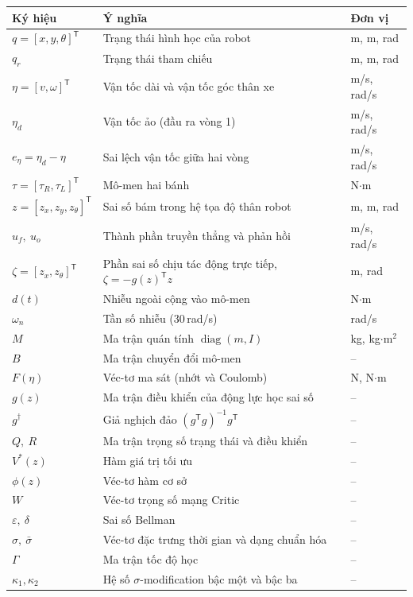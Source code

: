\documentclass[12pt,a4paper]{article}
\newcommand{\T}{\mathsf{T}}
\DeclareMathOperator{\diag}{diag}
\begin{document}
\begin{table}[H]
\centering
\small
\begin{tabular}{lll}
\toprule
\textbf{Ký hiệu} & \textbf{Ý nghĩa} & \textbf{Đơn vị} \\
\midrule
$q = [x, y, \theta]^\T$ & Trạng thái hình học của robot & m, m, rad \\
$q_r$ & Trạng thái tham chiếu & m, m, rad \\
$\eta = [v, \omega]^\T$ & Vận tốc dài và vận tốc góc thân xe & m/s, rad/s \\
$\eta_d$ & Vận tốc ảo (đầu ra vòng 1) & m/s, rad/s \\
$e_\eta = \eta_d - \eta$ & Sai lệch vận tốc giữa hai vòng & m/s, rad/s \\
$\tau = [\tau_R, \tau_L]^\T$ & Mô-men hai bánh & N$\cdot$m \\
$z = [z_x, z_y, z_\theta]^\T$ & Sai số bám trong hệ tọa độ thân robot & m, m, rad \\
$u_f,\ u_o$ & Thành phần truyền thẳng và phản hồi & m/s, rad/s \\
$\zeta = [z_x, z_\theta]^\T$ & Phần sai số chịu tác động trực tiếp, $\zeta = -g(z)^\T z$ & m, rad \\
$d(t)$ & Nhiễu ngoài cộng vào mô-men & N$\cdot$m \\
$\omega_n$ & Tần số nhiễu ($30$\,rad/s) & rad/s \\
\midrule
$M$ & Ma trận quán tính $\diag(m, I)$ & kg, kg$\cdot$m$^2$ \\
$B$ & Ma trận chuyển đổi mô-men & -- \\
$F(\eta)$ & Véc-tơ ma sát (nhớt và Coulomb) & N, N$\cdot$m \\
$g(z)$ & Ma trận điều khiển của động lực học sai số & -- \\
$g^\dagger$ & Giả nghịch đảo $(g^\T g)^{-1} g^\T$ & -- \\
\midrule
$Q,\ R$ & Ma trận trọng số trạng thái và điều khiển & -- \\
$V^*(z)$ & Hàm giá trị tối ưu & -- \\
$\phi(z)$ & Véc-tơ hàm cơ sở & -- \\
$W$ & Véc-tơ trọng số mạng Critic & -- \\
$\varepsilon,\ \delta$ & Sai số Bellman & -- \\
$\sigma,\ \bar\sigma$ & Véc-tơ đặc trưng thời gian và dạng chuẩn hóa & -- \\
$\Gamma$ & Ma trận tốc độ học & -- \\
$\kappa_1, \kappa_2$ & Hệ số $\sigma$-modification bậc một và bậc ba & -- \\
\bottomrule
\end{tabular}
\end{table}
\end{document}
